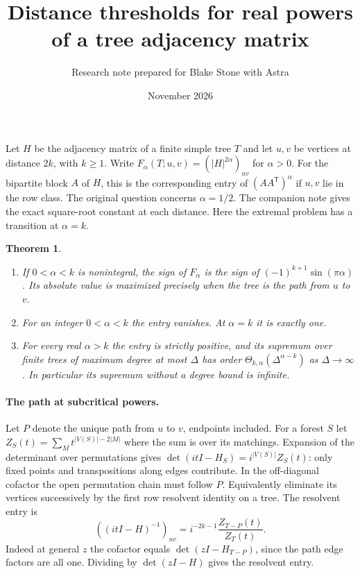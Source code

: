\documentclass[11pt]{article}
\title{Distance thresholds for real powers of a tree adjacency matrix}
\author{Research note prepared for Blake Stone with Astra}\date{November 2026}
\newtheorem{theorem}{Theorem}
\begin{document}
\maketitle
Let $H$ be the adjacency matrix of a finite simple tree $T$ and let $u,v$ be vertices at distance $2k$, with $k\ge1$. Write $F_\alpha(T;u,v)=(|H|^{2\alpha})_{uv}$ for $\alpha>0$. For the bipartite block $A$ of $H$, this is the corresponding entry of $(AA^{\mathsf T})^\alpha$ if $u,v$ lie in the row class. The original question \cite{mo} concerns $\alpha=1/2$. The companion note gives the exact square-root constant at each distance. Here the extremal problem has a transition at $\alpha=k$.
\begin{theorem}
\begin{enumerate}
\item If $0<\alpha<k$ is nonintegral, the sign of $F_\alpha$ is the sign of $(-1)^{k+1}\sin(\pi\alpha)$. Its absolute value is maximized precisely when the tree is the path from $u$ to $v$.
\item For an integer $0<\alpha<k$ the entry vanishes. At $\alpha=k$ it is exactly one.
\item For every real $\alpha>k$ the entry is strictly positive, and its supremum over finite trees of maximum degree at most $\Delta$ has order $\Theta_{k,\alpha}(\Delta^{\alpha-k})$ as $\Delta\to\infty$. In particular its supremum without a degree bound is infinite.
\end{enumerate}
\end{theorem}

\paragraph{The path at subcritical powers.}
Let $P$ denote the unique path from $u$ to $v$, endpoints included. For a forest $S$ let $Z_S(t)=\sum_M t^{|V(S)|-2|M|}$ where the sum is over its matchings. Expansion of the determinant over permutations gives $\det(itI-H_S)=i^{|V(S)|}Z_S(t)$: only fixed points and transpositions along edges contribute. In the off-diagonal cofactor the open permutation chain must follow $P$. Equivalently eliminate its vertices successively by the first row resolvent identity on a tree. The resolvent entry is
\[
 ((itI-H)^{-1})_{uv}=i^{-2k-1}\frac{Z_{T-P}(t)}{Z_T(t)}.
\]
Indeed at general $z$ the cofactor equals $\det(zI-H_{T-P})$, since the path edge factors are all one. Dividing by $\det(zI-H)$ gives the resolvent entry.
\end{document}
